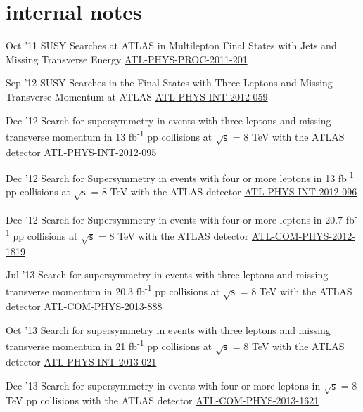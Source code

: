 \documentclass[]{cv} %
\begin{document}
\ifinternalNotes
\section{internal notes}
\begin{entrylist}

\entry
{Oct '11}
{{\normalfont SUSY Searches at ATLAS in Multilepton Final States with Jets and Missing Transverse Energy}}
{\href{https://cds.cern.ch/record/1394331}{ATL-PHYS-PROC-2011-201}}
{\vspace*{-8pt}}

\entry
{Sep '12}
{{\normalfont SUSY Searches in the Final States with Three Leptons and Missing Transverse Momentum at ATLAS}}
{\href{https://cds.cern.ch/record/1482141}{ATL-PHYS-INT-2012-059}}
{\vspace*{-8pt}}

\entry
{Dec '12}
{{\normalfont Search for supersymmetry in events with three leptons and missing transverse momentum in 13 fb\textsuperscript{-1} pp collisions
at $\sqrt{\mathsf{s}}$ = 8 TeV with the ATLAS detector}}
{\href{https://cds.cern.ch/record/1498390}{ATL-PHYS-INT-2012-095}}
{\vspace*{-8pt}}

\entry
{Dec '12}
{{\normalfont Search for Supersymmetry in events with four or more leptons in 13 fb\textsuperscript{-1} pp collisions at $\sqrt{\mathsf{s}}$ =
8 TeV with the ATLAS detector}}
{\href{https://cds.cern.ch/record/1498627}{ATL-PHYS-INT-2012-096}}
{\vspace*{-8pt}}

\entry
{Dec '12}
{{\normalfont Search for Supersymmetry in events with four or more leptons in 20.7 fb\textsuperscript{-1} pp collisions at $\sqrt{\mathsf{s}}$
= 8 TeV with the ATLAS detector}}
{\href{https://cds.cern.ch/record/1501709}{ATL-COM-PHYS-2012-1819}}
{\vspace*{-8pt}}

\entry
{Jul '13}
{{\normalfont Search for supersymmetry in events with three leptons and missing transverse momentum in 20.3 fb\textsuperscript{-1} pp
collisions at $\sqrt{\mathsf{s}}$ = 8 TeV with the ATLAS detector}}
{\href{https://cds.cern.ch/record/1558985}{ATL-COM-PHYS-2013-888}}
{\vspace*{-8pt}}

\entry
{Oct '13}
{{\normalfont Search for supersymmetry in events with three leptons and missing transverse momentum in 21 fb\textsuperscript{-1} pp collisions
at $\sqrt{\mathsf{s}}$ = 8 TeV with the ATLAS detector}}
{\href{https://cds.cern.ch/record/1610185}{ATL-PHYS-INT-2013-021}}
{\vspace*{-8pt}}

\entry
{Dec '13}
{{\normalfont Search for supersymmetry in events with four or more leptons in $\sqrt{\mathsf{s}}$ = 8 TeV pp collisions with the ATLAS
detector}}
{\href{https://cds.cern.ch/record/1635455}{ATL-COM-PHYS-2013-1621}}
{\vspace*{-8pt}}

\end{entrylist}
\fi
\end{document}
